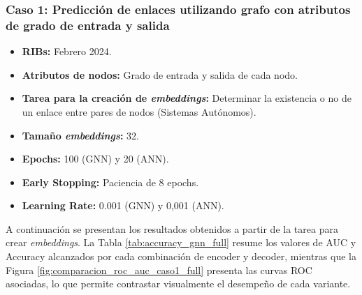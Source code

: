 

\subsubsection{Caso 1: Predicción de enlaces utilizando grafo con atributos de grado de entrada y salida}


\begin{itemize}
    \item \textbf{RIBs:} Febrero 2024.
    \item \textbf{Atributos de nodos:} Grado de entrada y salida de cada nodo.
    \item \textbf{Tarea para la creación de \textit{embeddings}:}  Determinar la existencia o no de un enlace entre pares de nodos (Sistemas Autónomos).
    \item \textbf{Tamaño \textit{embeddings}:} 32.
    \item \textbf{Epochs:} 100 (GNN) y 20 (ANN).
    \item \textbf{Early Stopping:} Paciencia de 8 epochs.
    \item \textbf{Learning Rate:} 0.001 (GNN) y 0,001 (ANN). 
\end{itemize}



A continuación se presentan los resultados obtenidos a partir de la tarea para crear \textit{embeddings}. La Tabla \ref{tab:accuracy_gnn_full} resume los valores de AUC y Accuracy alcanzados por cada combinación de encoder y decoder, mientras que la Figura \ref{fig:comparacion_roc_auc_caso1_full} presenta las curvas ROC asociadas, lo que permite contrastar visualmente el desempeño de cada variante.\\


